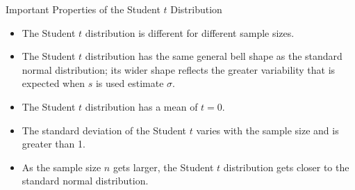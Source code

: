 \documentclass{beamer}
\begin{document}
\begin{frame}
\begin{block}{Important Properties of the Student $t$ Distribution}
\begin{itemize}[<+- | alert@+>]
\item The Student $t$ distribution is different for different sample sizes.
\item The Student $t$ distribution has the same general bell shape as the standard normal distribution; its wider shape reflects the greater variability that is expected when $s$ is used estimate $\sigma$.
\item The Student $t$ distribution has a mean of $t=0$.
\item The standard deviation of the Student $t$ varies with the sample size and is greater than 1.
\item As the sample size $n$ gets larger, the Student $t$ distribution gets closer to the standard normal distribution.
\end{itemize}
\end{block}
\end{frame}
\end{document}
